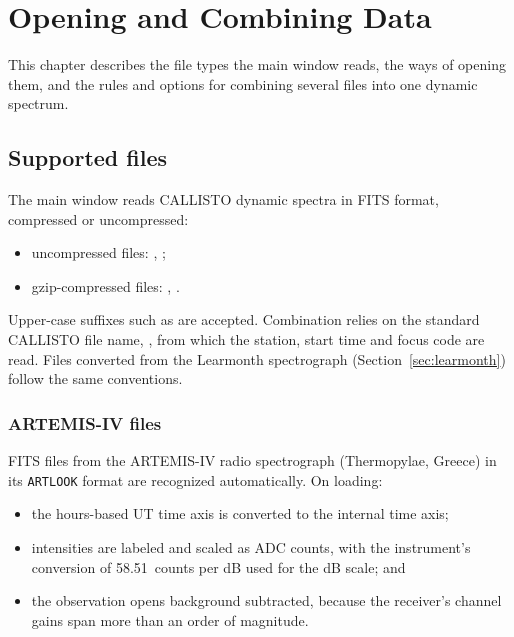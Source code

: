 \chapter{Opening and Combining Data}
\label{ch:opening}

This chapter describes the file types the main window reads, the ways of opening them,
and the rules and options for combining several files into one dynamic spectrum.

\section{Supported files}

The main window reads CALLISTO dynamic spectra in FITS format, compressed or
uncompressed:
\begin{itemize}
  \item uncompressed files: , ;
  \item gzip-compressed files: , .
\end{itemize}
Upper-case suffixes such as  are accepted. Combination relies on the standard
CALLISTO file name, , from which the station, start time
and focus code are read. Files converted from the Learmonth spectrograph
(Section~\ref{sec:learmonth}) follow the same conventions.

\subsection{ARTEMIS-IV files}
\label{sec:artemis}

FITS files from the ARTEMIS-IV radio spectrograph (Thermopylae, Greece) in its
\texttt{ARTLOOK} format are recognized automatically. On loading:
\begin{itemize}
  \item the hours-based UT time axis is converted to the internal time axis;
  \item intensities are labeled and scaled as ADC counts, with the instrument's
    conversion of 58.51~counts per dB used for the dB scale; and
  \item the observation opens background subtracted, because the receiver's channel gains
    span more than an order of magnitude.
\end{itemize}

